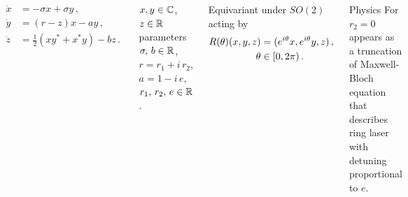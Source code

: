 \documentclass{beamer}
\begin{document}
\begin{frame}{\CLe}
  \begin{columns}[t]
    \begin{exampleblock}{\CLe}
      	\[
		\begin{split}
			\dot{x} &=-\sigma x+ \sigma y \,,\\
			\dot{y} &=(r-z)x-a y \,,\\
			\dot{z} &= \frac{1}{2}\left(x y^*+x^*y\right)-b z\,.
		\end{split}
	\]
    \end{exampleblock}
     \begin{block}{ }
       $x,y\in\mathbb{C}^{}$, $z\in\mathbb{R}^{}$ parameters $\sigma,\,b\in\mathbb{R}^{}$, $r=r_1+i\, r_2$, $a=1-i\, e$, $r_1,\,r_2,\,e\in\mathbb{R}^{}$.
    \end{block}

    \begin{exampleblock}{Equivariant under}
	$SO(2)$ acting by
      	\[
	\begin{split}
 		R(\theta) (x,y,z) &= (e^{i\theta} x, e^{i\theta} y, z)\,, \\
			\theta	& \in[0,2\pi)\,.
	\end{split}
	\]
    \end{exampleblock}
    \begin{exampleblock}{Physics}
	For $r_2=0$ appears as a truncation of Maxwell-Bloch equation
	that describes ring laser with detuning proportional to $e$.
    \end{exampleblock}

  \end{columns}
\end{frame}
\end{document}

